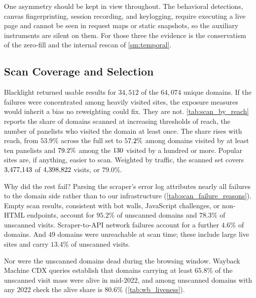 \documentclass[12pt, letterpaper]{article}
\begin{document}
One asymmetry should be kept in view throughout. The behavioral detections, canvas fingerprinting, session recording, and keylogging, require executing a live page and cannot be seen in request maps or static snapshots, so the auxiliary instruments are silent on them. For those three the evidence is the conservatism of the zero-fill and the internal rescan of \cref{sm:temporal}.
 
\subsection{Scan Coverage and Selection}
\label{sm:selection}


Blacklight returned usable results for $34{,}512$ of the $64{,}074$ unique domains. If the failures were concentrated among heavily visited sites, the exposure measures would inherit a bias no reweighting could fix. They are not. \cref{tab:scan_by_reach} reports the share of domains scanned at increasing thresholds of reach, the number of panelists who visited the domain at least once. The share rises with reach, from $53.9\%$ across the full set to $57.2\%$ among domains visited by at least ten panelists and $79.2\%$ among the $130$ visited by a hundred or more. Popular sites are, if anything, easier to scan. Weighted by traffic, the scanned set covers $3{,}477{,}143$ of $4{,}398{,}822$ visits, or $79.0\%$.
 
Why did the rest fail? Parsing the scraper's error log attributes nearly all failures to the domain side rather than to our infrastructure (\cref{tab:scan_failure_reasons}). Empty scan results, consistent with bot walls, JavaScript challenges, or non-HTML endpoints, account for $95.2\%$ of unscanned domains and $78.3\%$ of unscanned visits. Scraper-to-API network failures account for a further $4.6\%$ of domains. And $49$ domains were unreachable at scan time; these include large live sites and carry $13.4\%$ of unscanned visits.
 
Nor were the unscanned domains dead during the browsing window. Wayback Machine CDX queries establish that domains carrying at least $65.8\%$ of the unscanned visit mass were alive in mid-2022, and among unscanned domains with any 2022 check the alive share is $80.6\%$ (\cref{tab:wb_liveness}).
 
\end{document}
